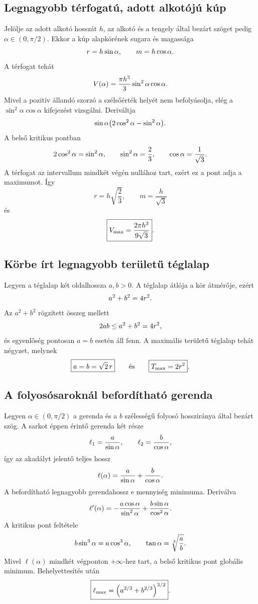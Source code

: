 \documentclass{szb-solution}
\begin{document}
\subsection{Legnagyobb térfogatú, adott alkotójú kúp}

Jelölje az adott alkotó hosszát $h$, az alkotó és a tengely által bezárt
szöget pedig $\alpha\in(0,\pi/2)$. Ekkor a kúp alapkörének sugara és
magassága
$$
  r=h\sin\alpha,
  \qquad
  m=h\cos\alpha
  \text.
$$
A térfogat tehát
$$
  V(\alpha)=\frac{\pi h^3}{3}\sin^2\alpha\cos\alpha
  \text.
$$
Mivel a pozitív állandó szorzó a szélsőérték helyét nem befolyásolja,
elég a $\sin^2\alpha\cos\alpha$ kifejezést vizsgálni. Deriváltja
$$
  \sin\alpha\bigl(2\cos^2\alpha-\sin^2\alpha\bigr)
  \text.
$$
A belső kritikus pontban
$$
  2\cos^2\alpha=\sin^2\alpha,
  \qquad
  \sin^2\alpha=\frac23,
  \qquad
  \cos\alpha=\frac1{\sqrt3}
  \text.
$$
A térfogat az intervallum mindkét végén nullához tart, ezért ez a pont adja
a maximumot. Így
$$
  \boxed{r=h\sqrt{\frac23},\qquad m=\frac{h}{\sqrt3}}
$$
és
$$
  \boxed{V_{\max}=\frac{2\pi h^3}{9\sqrt3}}
  \text.
$$

\subsection{Körbe írt legnagyobb területű téglalap}

Legyen a téglalap két oldalhossza $a,b>0$. A téglalap átlója a kör
átmérője, ezért
$$
  a^2+b^2=4r^2
  \text.
$$
Az $a^2+b^2$ rögzített összeg mellett
$$
  2ab\leq a^2+b^2=4r^2
  \text,
$$
és egyenlőség pontosan $a=b$ esetén áll fenn. A maximális területű
téglalap tehát négyzet, melynek
$$
  \boxed{a=b=\sqrt2\,r}
  \qquad\text{és}\qquad
  \boxed{T_{\max}=2r^2}
  \text.
$$

\subsection{A folyosósaroknál befordítható gerenda}

Legyen $\alpha\in(0,\pi/2)$ a gerenda és a $b$ szélességű folyosó
hossziránya által bezárt szög. A sarkot éppen érintő gerenda két része
$$
  \ell_1=\frac{a}{\sin\alpha},
  \qquad
  \ell_2=\frac{b}{\cos\alpha}
  \text,
$$
így az akadályt jelentő teljes hossz
$$
  \ell(\alpha)=\frac{a}{\sin\alpha}+\frac{b}{\cos\alpha}
  \text.
$$
A befordítható legnagyobb gerendahossz e mennyiség minimuma. Deriválva
$$
  \ell'(\alpha)
  =-\frac{a\cos\alpha}{\sin^2\alpha}
   +\frac{b\sin\alpha}{\cos^2\alpha}
  \text.
$$
A kritikus pont feltétele
$$
  b\sin^3\alpha=a\cos^3\alpha,
  \qquad
  \tan\alpha=\sqrt[3]{\frac ab}
  \text.
$$
Mivel $\ell(\alpha)$ mindkét végponton $+\infty$-hez tart, a belső
kritikus pont globális minimum. Behelyettesítés után
$$
  \boxed{\ell_{\max}
  =\left(a^{2/3}+b^{2/3}\right)^{3/2}}
  \text.
$$
\end{document}
